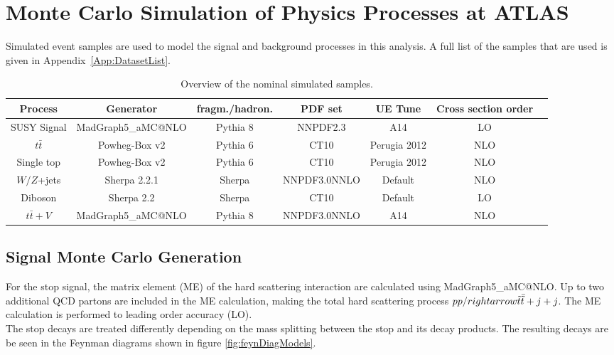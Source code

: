 \chapter{Monte Carlo Simulation of Physics Processes at ATLAS}
\label{chap:MCSimulation}

\indent Simulated event samples are used to model the signal and background processes in this analysis. A full list of the samples that are used is given in Appendix~\ref{App:DatasetList}.

\begin{table}[htpb]
  \centering
  \small
  \begin{tabular}{ccccccc}
    Process & Generator & fragm./hadron. & PDF set  & UE Tune & Cross section order\\
    \hline 
    \hline
    SUSY Signal & {\sc MadGraph5\_aMC\/@NLO} & {\sc Pythia} 8 & NNPDF2.3 & A14 & LO  & \\ 
    $t\bar{t}$ & {\sc Powheg-Box} v2 & {\sc Pythia} 6 & CT10  & {\sc Perugia 2012} & NLO & \\ 
    Single top & {\sc Powheg-Box} v2 & {\sc Pythia} 6 & CT10  & {\sc Perugia 2012} & NLO & \\ 
    $W/Z$+jets & {\sc Sherpa} 2.2.1 & {\sc Sherpa}  & NNPDF3.0NNLO & Default & NLO & \\ 
    Diboson & {\sc Sherpa} 2.2 & {\sc Sherpa} & CT10 & Default & LO\\ 
    $t\bar{t}+V$ & {\sc MadGraph5\_aMC\/@NLO} & {\sc Pythia} 8 & NNPDF3.0NNLO & A14 & NLO \\ 
    \hline
    \hline
  \end{tabular}
  \caption{Overview of the nominal simulated samples. }
  \label{tab:mc_samples1}
\end{table}

\section{Signal Monte Carlo Generation}
\label{sec:MC:Sig}

\indent For the stop signal, the matrix element (ME) of the hard scattering interaction are calculated using {\sc MadGraph5\_aMC\/@NLO}.  Up to two additional QCD partons are included in the ME calculation, making the total hard scattering process $pp /rightarrow {\tilde{t}}\bar{\tilde{t}} + j + j $.  The ME calculation is performed to leading order accuracy (LO).  \\

\indent The stop decays are treated differently depending on the mass splitting between the stop and its decay products.  The resulting decays are be seen in the Feynman diagrams shown in figure \ref{fig:feynDiagModels}. \\

